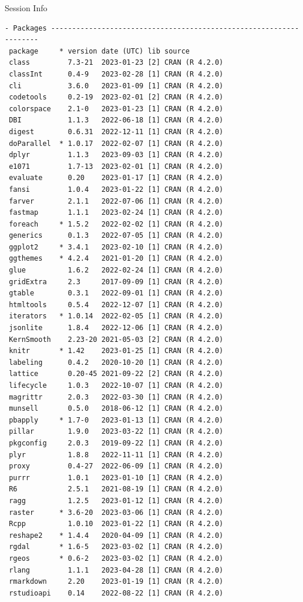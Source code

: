 \documentclass[
  ignorenonframetext,
  aspectratio=169,
]{beamer}
\begin{document}
\begin{frame}[fragile]{Session Info}
\begin{verbatim}
- Packages -------------------------------------------------------------------
 package     * version date (UTC) lib source
 class         7.3-21  2023-01-23 [2] CRAN (R 4.2.0)
 classInt      0.4-9   2023-02-28 [1] CRAN (R 4.2.0)
 cli           3.6.0   2023-01-09 [1] CRAN (R 4.2.0)
 codetools     0.2-19  2023-02-01 [2] CRAN (R 4.2.0)
 colorspace    2.1-0   2023-01-23 [1] CRAN (R 4.2.0)
 DBI           1.1.3   2022-06-18 [1] CRAN (R 4.2.0)
 digest        0.6.31  2022-12-11 [1] CRAN (R 4.2.0)
 doParallel  * 1.0.17  2022-02-07 [1] CRAN (R 4.2.0)
 dplyr         1.1.3   2023-09-03 [1] CRAN (R 4.2.0)
 e1071         1.7-13  2023-02-01 [1] CRAN (R 4.2.0)
 evaluate      0.20    2023-01-17 [1] CRAN (R 4.2.0)
 fansi         1.0.4   2023-01-22 [1] CRAN (R 4.2.0)
 farver        2.1.1   2022-07-06 [1] CRAN (R 4.2.0)
 fastmap       1.1.1   2023-02-24 [1] CRAN (R 4.2.0)
 foreach     * 1.5.2   2022-02-02 [1] CRAN (R 4.2.0)
 generics      0.1.3   2022-07-05 [1] CRAN (R 4.2.0)
 ggplot2     * 3.4.1   2023-02-10 [1] CRAN (R 4.2.0)
 ggthemes    * 4.2.4   2021-01-20 [1] CRAN (R 4.2.0)
 glue          1.6.2   2022-02-24 [1] CRAN (R 4.2.0)
 gridExtra     2.3     2017-09-09 [1] CRAN (R 4.2.0)
 gtable        0.3.1   2022-09-01 [1] CRAN (R 4.2.0)
 htmltools     0.5.4   2022-12-07 [1] CRAN (R 4.2.0)
 iterators   * 1.0.14  2022-02-05 [1] CRAN (R 4.2.0)
 jsonlite      1.8.4   2022-12-06 [1] CRAN (R 4.2.0)
 KernSmooth    2.23-20 2021-05-03 [2] CRAN (R 4.2.0)
 knitr       * 1.42    2023-01-25 [1] CRAN (R 4.2.0)
 labeling      0.4.2   2020-10-20 [1] CRAN (R 4.2.0)
 lattice       0.20-45 2021-09-22 [2] CRAN (R 4.2.0)
 lifecycle     1.0.3   2022-10-07 [1] CRAN (R 4.2.0)
 magrittr      2.0.3   2022-03-30 [1] CRAN (R 4.2.0)
 munsell       0.5.0   2018-06-12 [1] CRAN (R 4.2.0)
 pbapply     * 1.7-0   2023-01-13 [1] CRAN (R 4.2.0)
 pillar        1.9.0   2023-03-22 [1] CRAN (R 4.2.0)
 pkgconfig     2.0.3   2019-09-22 [1] CRAN (R 4.2.0)
 plyr          1.8.8   2022-11-11 [1] CRAN (R 4.2.0)
 proxy         0.4-27  2022-06-09 [1] CRAN (R 4.2.0)
 purrr         1.0.1   2023-01-10 [1] CRAN (R 4.2.0)
 R6            2.5.1   2021-08-19 [1] CRAN (R 4.2.0)
 ragg          1.2.5   2023-01-12 [1] CRAN (R 4.2.0)
 raster      * 3.6-20  2023-03-06 [1] CRAN (R 4.2.0)
 Rcpp          1.0.10  2023-01-22 [1] CRAN (R 4.2.0)
 reshape2    * 1.4.4   2020-04-09 [1] CRAN (R 4.2.0)
 rgdal       * 1.6-5   2023-03-02 [1] CRAN (R 4.2.0)
 rgeos       * 0.6-2   2023-03-02 [1] CRAN (R 4.2.0)
 rlang         1.1.1   2023-04-28 [1] CRAN (R 4.2.0)
 rmarkdown     2.20    2023-01-19 [1] CRAN (R 4.2.0)
 rstudioapi    0.14    2022-08-22 [1] CRAN (R 4.2.0)

\end{verbatim}
\end{frame}
\end{document}
